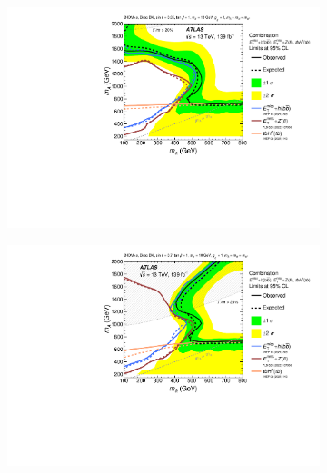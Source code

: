 \begin{figure}[h!]
    \centering
    \begin{subfigure}[2]{0.495\textwidth}
        \centering
        \includegraphics[width=\linewidth]{figures/fig_04a.pdf}
        \caption{}
        \label{fig:result-ma-mA-scan-a}
    \end{subfigure}
    \begin{subfigure}[2]{0.495\textwidth}
        \centering
        \includegraphics[width=\linewidth]{figures/fig_04b.pdf}
        \caption{}
        \label{fig:result-ma-mA-scan-b}
    \end{subfigure}
    \begin{subfigure}[2]{0.495\textwidth}
        \centering

\end{subfigure}
\end{figure}

